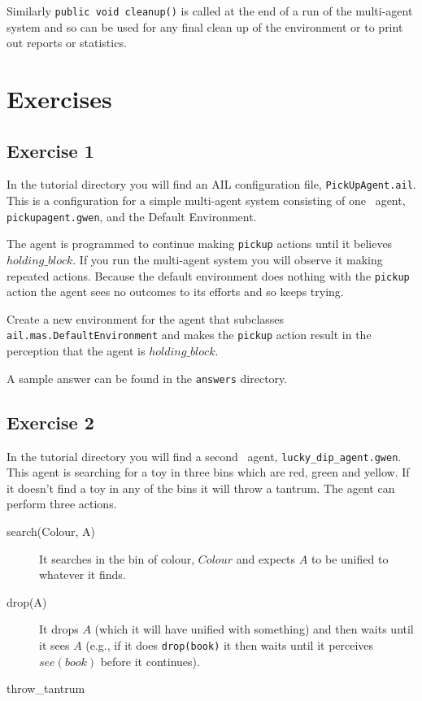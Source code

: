 \documentclass[a4]{article}
\begin{document}
Similarly \texttt{public void cleanup()} is called at the end of a run of the multi-agent system and so can be used for any final clean up of the environment or to print out reports or statistics.

\section{Exercises}

\subsection{Exercise 1}
In the tutorial directory you will find an AIL configuration file, \texttt{PickUpAgent.ail}.  This is a configuration for a simple multi-agent system consisting of one \gwendolen\ agent, \texttt{pickupagent.gwen}, and the Default Environment.

The agent is programmed to continue making \texttt{pickup} actions  until it believes $holding\_block$.  If you run the multi-agent system you will observe it making repeated actions.  Because the default environment does nothing with the \texttt{pickup} action the agent sees no outcomes to its efforts and so keeps trying.

\begin{sloppypar}
Create a new environment for the agent that subclasses \texttt{ail.mas.DefaultEnvironment} and makes the \texttt{pickup} action result in the perception that the agent is $holding\_block$.
\end{sloppypar}

A sample answer can be found in the \texttt{answers} directory.

\subsection{Exercise 2}
\begin{sloppypar}
In the tutorial directory you will find a second \gwendolen\ agent, \texttt{lucky\_dip\_agent.gwen}.  This agent is searching for a toy in three bins which are red, green and yellow.  If it doesn't find a toy in any of the bins it will throw a tantrum.  The agent can perform three actions.
\end{sloppypar}

\begin{description}
\item[search(Colour, A)] It searches in the bin of colour, $Colour$ and expects $A$ to be unified to whatever it finds. 
\item[drop(A)] It drops $A$ (which it will have unified with something) and then waits until it sees $A$ (e.g., if it does \texttt{drop(book)} it then waits until it perceives $see(book)$ before it continues).
\item[throw\_tantrum]
\end{description}
\end{document}
